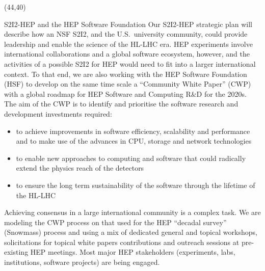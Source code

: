 



\begin{textblock}{38.0}(44,40)
\begin{block}{S2I2-HEP and the HEP Software Foundation}
Our S2I2-HEP strategic plan will describe how an NSF S2I2, and the
U.S.\ university community, could provide leadership and enable the
science of the HL-LHC era.  HEP experiments involve international
collaborations and a global software ecosystem, however, and the
activities of a possible S2I2 for HEP would need to fit into a
larger international context. To that end, we are also working with
the HEP Software Foundation (HSF) to develop on the same time scale
a ``Community White Paper'' (CWP) with a global roadmap for HEP
Software and Computing R\&D for the 2020s. The aim of the CWP is
to identify and prioritise the software research and development
investments required:

\begin{itemize}
\item to achieve improvements in software efficiency, scalability and performance and to make use of the advances in CPU, storage and network technologies
\item to enable new approaches to computing and software that could radically extend the physics reach of the detectors
\item to ensure the long term sustainability of the software through the lifetime of the HL-LHC
\end{itemize}

Achieving consensus in a large international community is a complex task. We are modeling the CWP process on that used for the HEP ``decadal survey'' (Snowmass) process and using a mix of dedicated general and topical workshops, solicitations for topical white papers contributions and outreach sessions at pre-existing HEP meetings. Most major HEP stakeholders (experiments, labs, institutions, software projects) are being engaged.
\end{block}
\end{textblock}


